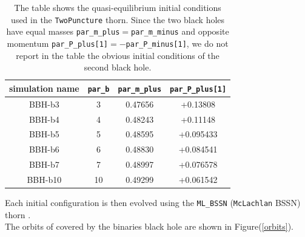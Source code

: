 \begin{table}
\centering
\begin{tabular}{|c|c|c|c|}
\hline 
simulation name & \texttt{par\_b} & \texttt{par\_m\_plus} & \texttt{par\_P\_plus[1]} \\ 
\hline 
BBH-b3 & 3 & 0.47656
 & +0.13808 \\ 
BBH-b4 & 4 & 0.48243 & +0.11148 \\ 
BBH-b5 & 5 & 0.48595 & +0.095433 \\ 
BBH-b6 & 6 & 0.48830 & +0.084541 \\ 
BBH-b7 & 7 &  0.48997 & +0.076578 \\ 
BBH-b10 & 10 & 0.49299 & +0.061542 \\ 
\hline 
\end{tabular} 
\caption{The table shows the quasi-equilibrium initial conditions used in the \texttt{TwoPuncture} thorn. Since the two black holes have equal masses \texttt{par\_m\_plus}$=$\texttt{par\_m\_minus} and opposite momentum \texttt{par\_P\_plus[1]}$=- $\texttt{par\_P\_minus[1]}, we do not report in the table the obvious initial conditions of the second black hole.}
\label{initial_conditions_bbh}
\end{table}
Each initial configuration is then evolved using the \texttt{ML\_BSSN} (\texttt{McLachlan} BSSN) thorn \cite{Brown:2008sb,McLachlan:web,Kranc:web}.\\
The orbits of covered by the binaries black hole are shown in Figure(\ref{orbits}).
